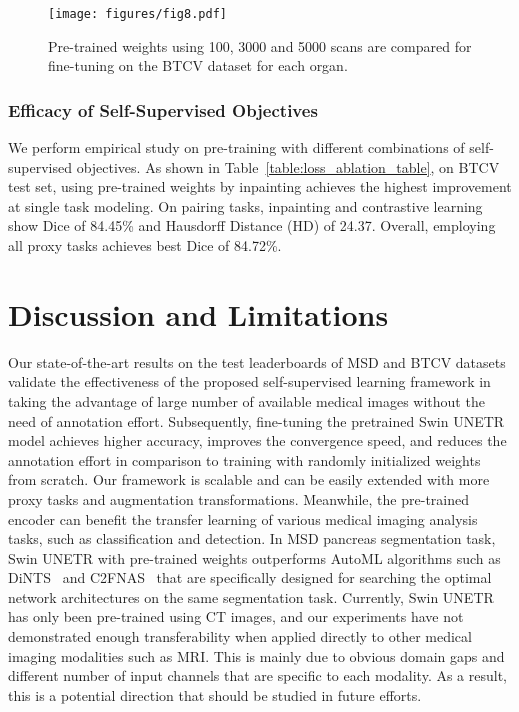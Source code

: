 \documentclass[10pt,twocolumn,letterpaper]{article}
\begin{document}
\begin{figure}[t]
\texttt{[image: figures/fig8.pdf]}
\caption{Pre-trained weights using 100, 3000 and 5000 scans are compared for fine-tuning on the BTCV dataset for each organ. }
  \label{fig:fig8}
\end{figure}
\subsubsection{Efficacy of Self-Supervised Objectives}
We perform empirical study on pre-training with different combinations of self-supervised objectives. As shown in Table~\ref{table:loss_ablation_table}, on BTCV test set, using pre-trained weights by inpainting achieves the highest improvement at single task modeling. On pairing tasks, inpainting and contrastive learning show Dice of 84.45\% and Hausdorff Distance (HD) of 24.37. Overall, employing all proxy tasks achieves best Dice of 84.72\%. 


\section{Discussion and Limitations}
\vspace*{-0.8mm}
Our state-of-the-art results on the test leaderboards of MSD and BTCV datasets validate the effectiveness of the proposed self-supervised learning framework in taking the advantage of large number of available medical images without the need of annotation effort. Subsequently, fine-tuning the pretrained Swin UNETR model achieves higher accuracy, improves the convergence speed, and reduces the annotation effort in comparison to training with randomly initialized weights from scratch. 
Our framework is scalable and can be easily extended with more proxy tasks and augmentation transformations. Meanwhile, the pre-trained encoder can benefit the transfer learning of various medical imaging analysis tasks, such as classification and detection. In MSD pancreas segmentation task, Swin UNETR with pre-trained weights outperforms AutoML algorithms such as DiNTS~\cite{he2021dints} and C2FNAS~\cite{yu2020c2fnas} that are specifically designed for searching the optimal network architectures on the same segmentation task. Currently, Swin UNETR has only been pre-trained using CT images, and our experiments have not demonstrated enough transferability when applied directly to other medical imaging modalities such as MRI. This is mainly due to obvious domain gaps and different number of input channels that are specific to each modality. As a result, this is a potential direction that should be studied in future efforts.
\vspace*{-1.7mm}
\end{document}
